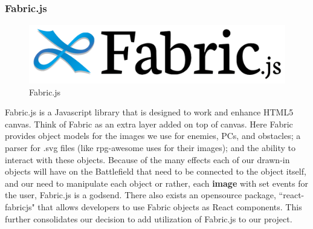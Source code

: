 \documentclass[12pt,a4paper]{report}
\begin{document}
			\subsubsection{Fabric.js}
			\begin{figure}
				\includegraphics[scale=0.15]{fabric}
				\caption{Fabric.js}
				\label{fig: Fabric.js}
			\end{figure}
			Fabric.js is a Javascript library that is designed to work and enhance HTML5 canvas. Think of Fabric as an extra layer added on top of canvas. Here Fabric provides object models for the images we use for enemies, PCs, and obstacles; a parser for .svg files (like rpg-awesome uses for their images); and the ability to interact with these objects. Because of the many effects each of our drawn-in objects will have on the Battlefield that need to be connected to the object itself, and our need to manipulate each object or rather, each \textbf{image} with set events for the user, Fabric.js is a godsend. There also exists an opensource package, ``react-fabricjs" that allows developers to use Fabric objects as React components. This further consolidates our decision to add utilization of Fabric.js to our project. \cite{fabricjs}
			\newpage
\end{document}
